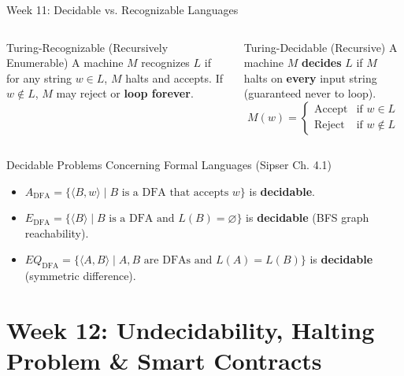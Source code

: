 \documentclass[aspectratio=169,10pt]{beamer}
\begin{document}
\begin{frame}{Week 11: Decidable vs. Recognizable Languages}
    \begin{columns}[T]
        \begin{block}{Turing-Recognizable (Recursively Enumerable)}
            A machine $M$ recognizes $L$ if for any string $w \in L$, $M$ halts and accepts. If $w \notin L$, $M$ may reject or \textbf{loop forever}.
        \end{block}
        
        \begin{exampleblock}{Turing-Decidable (Recursive)}
            A machine $M$ \textbf{decides} $L$ if $M$ halts on \textbf{every} input string (guaranteed never to loop).
            $$M(w) = \begin{cases} \text{Accept} & \text{if } w \in L \\ \text{Reject} & \text{if } w \notin L \end{cases}$$
        \end{exampleblock}
    \end{columns}
    
    \begin{block}{Decidable Problems Concerning Formal Languages (Sipser Ch. 4.1)}
        \begin{itemize}
            \item $A_{\text{DFA}} = \{\langle B, w \rangle \mid B \text{ is a DFA that accepts } w\}$ is \textbf{decidable}.
            \item $E_{\text{DFA}} = \{\langle B \rangle \mid B \text{ is a DFA and } L(B) = \varnothing\}$ is \textbf{decidable} (BFS graph reachability).
            \item $EQ_{\text{DFA}} = \{\langle A, B \rangle \mid A, B \text{ are DFAs and } L(A) = L(B)\}$ is \textbf{decidable} (symmetric difference).
        \end{itemize}
    \end{block}
\end{frame}

\section{Week 12: Undecidability, Halting Problem \& Smart Contracts}
\end{document}
